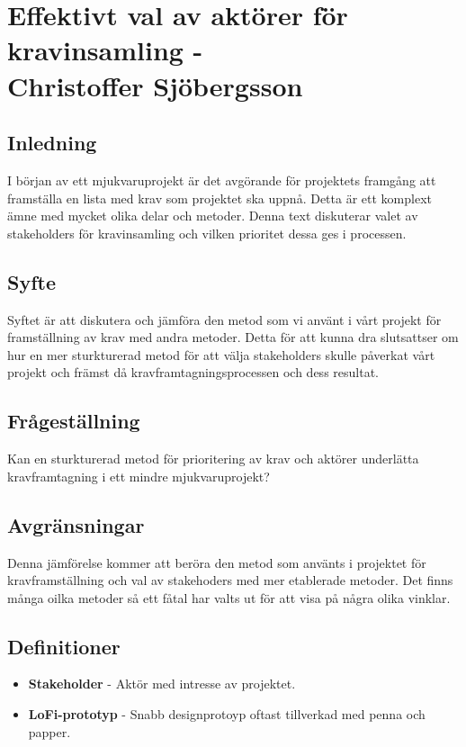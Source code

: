 \chapter{Effektivt val av aktörer för \\kravinsamling - \\ Christoffer Sjöbergsson}

\section{Inledning}
I början av ett mjukvaruprojekt är det avgörande för projektets framgång att framställa en lista med krav som projektet ska uppnå. Detta är ett komplext ämne med mycket olika delar och metoder. Denna text diskuterar valet av stakeholders för kravinsamling och vilken prioritet dessa ges i processen.

\section{Syfte}
Syftet är att diskutera och jämföra den metod som vi använt i vårt projekt för framställning av krav med andra metoder. Detta för att kunna dra slutsattser om hur en mer sturkturerad metod för att välja stakeholders skulle påverkat vårt projekt och främst då kravframtagningsprocessen och dess resultat.

\section{Frågeställning}
Kan en sturkturerad metod för prioritering av krav och aktörer underlätta kravframtagning i ett mindre mjukvaruprojekt?

\section{Avgränsningar}
Denna jämförelse kommer att beröra den metod som använts i projektet för kravframställning och val av stakehoders med mer etablerade metoder. Det finns många oilka metoder så ett fåtal har valts ut för att visa på några olika vinklar. 

\section{Definitioner}
\begin{itemize}
	\item \textbf{Stakeholder} - Aktör med intresse av projektet.
	\item \textbf{LoFi-prototyp} - Snabb designprotoyp oftast tillverkad med penna och papper.
\end{itemize}


